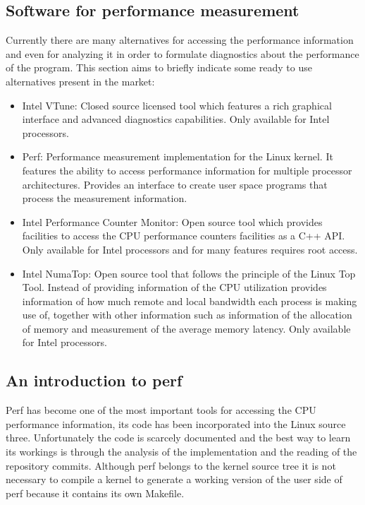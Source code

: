 \subsection{Software for performance measurement }\label{subsection:software-pm}

Currently there are many alternatives for accessing the performance information and even for analyzing it in order to formulate diagnostics about the performance of the program. This section aims to briefly indicate some ready to use alternatives present in the market:

\begin{itemize}
	\item Intel VTune: Closed source licensed tool which features a rich graphical interface and advanced diagnostics capabilities. Only available for Intel processors.
\item Perf: Performance measurement implementation for the Linux kernel. It features the ability to access performance information for multiple processor architectures. Provides an interface to create user space programs that process the measurement information.
\item Intel Performance Counter Monitor: Open source tool which provides facilities to access the CPU performance counters facilities as a C++ API. Only available for Intel processors and for many features requires root access.
\item Intel NumaTop: Open source tool that follows the principle of the Linux Top Tool. Instead of providing information of the CPU utilization provides information of how much remote and local bandwidth each process is making use of, together with other information such as information of the allocation of memory and measurement of the average memory latency. Only available for Intel processors. 
\end{itemize}

\subsection{An introduction to perf }\label{subsection:intro-perf}

Perf has become one of the most important tools for accessing the CPU performance information, its code has been incorporated into the Linux source three. Unfortunately the code is scarcely documented and the best way to learn its workings is through the analysis of the implementation and the reading of the repository commits. Although perf belongs to the kernel source tree it is not necessary to compile a kernel to generate a working version of the user side of perf because it contains its own Makefile.

